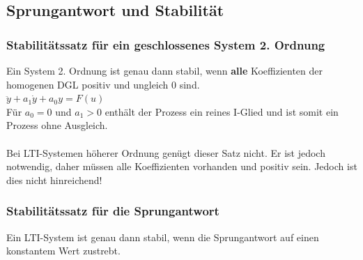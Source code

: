 			
	\subsection{Sprungantwort und Stabilität}
		\subsubsection{Stabilitätssatz für ein geschlossenes System 2. Ordnung }
			Ein System 2. Ordnung ist genau dann stabil, wenn {\bf alle} Koeffizienten der
			homogenen DGL positiv und ungleich 0 sind.\\
			$\ddot{y}+a_1\dot{y}+a_0y=F(u)$ \\
			Für $a_0 = 0$ und $a_1 > 0$ enthält der Prozess ein reines I-Glied und
			ist somit ein Prozess ohne Ausgleich.  \\ \\
			Bei LTI-Systemen höherer Ordnung genügt dieser Satz nicht. Er ist jedoch notwendig, daher müssen alle Koeffizienten vorhanden und positiv sein. Jedoch ist dies nicht hinreichend!
			
		\subsubsection{Stabilitätssatz für die Sprungantwort}
			Ein LTI-System ist genau dann stabil, wenn die Sprungantwort auf einen
			konstantem Wert zustrebt.
